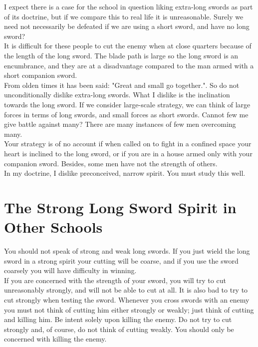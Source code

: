 I expect there is a case for the school in question liking extra-long swords as part of its doctrine, but if we compare this to real life it is unreasonable. Surely we need not necessarily be defeated if we are using a short sword, and have no long sword?\\

It is difficult for these people to cut the enemy when at close quarters because of the length of the long sword. The blade path is large so the long sword is an encumbrance, and they are at a disadvantage compared to the man armed with a short companion sword.\\

From olden times it has been said: "Great and small go together.". So do not unconditionally dislike extra-long swords. What I dislike is the inclination towards the long sword. If we consider large-scale strategy, we can think of large forces in terms of long swords, and small forces as short swords. Cannot few me give battle against many? There are many instances of few men overcoming many.\\

Your strategy is of no account if when called on to fight in a confined space your heart is inclined to the long sword, or if you are in a house armed only with your companion sword. Besides, some men have not the strength of others.\\

In my doctrine, I dislike preconceived, narrow spirit. You must study this well.\\
\section{The Strong Long Sword Spirit in Other Schools}

You should not speak of strong and weak long swords. If you just wield the long sword in a strong spirit your cutting will be coarse, and if you use the sword coarsely you will have difficulty in winning.\\

If you are concerned with the strength of your sword, you will try to cut unreasonably strongly, and will not be able to cut at all. It is also bad to try to cut strongly when testing the sword. Whenever you cross swords with an enemy you must not think of cutting him either strongly or weakly; just think of cutting and killing him. Be intent solely upon killing the enemy. Do not try to cut strongly and, of course, do not think of cutting weakly. You should only be concerned with killing the enemy.\\

